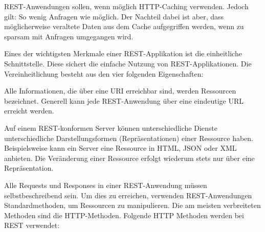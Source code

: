 
REST-Anwendungen sollen, wenn möglich HTTP-Caching verwenden. Jedoch gilt: So wenig Anfragen wie möglich. Der Nachteil dabei ist aber, dass möglicherweise veraltete Daten aus dem Cache aufgegriffen werden, wenn zu sparsam mit Anfragen umgegangen wird. \cite{WikiREST}


Eines der wichtigsten Merkmale einer REST-Applikation ist die einheitliche Schnittstelle. Diese sichert die einfache Nutzung von REST-Applikationen. Die Vereinheitlichung besteht aus den vier folgenden Eigenschaften:

\pagebreak


Alle Informationen, die über eine URI erreichbar sind, werden Ressourcen bezeichnet. Generell kann jede REST-Anwendung über eine eindeutige URL erreicht werden. \cite{WikiREST}


Auf einem REST-konformen Server können unterschiedliche Dienste unterschiedliche Darstellungsformen (Repräsentationen) einer Ressource haben. Beispielsweise kann ein Server eine Ressource in HTML, JSON oder XML anbieten. Die Veränderung einer Ressource erfolgt wiederum stets nur über eine Repräsentation. \cite{WikiREST}


Alle Requests und Responses in einer REST-Anwendung müssen selbstbeschreibend sein. Um dies zu erreichen, verwenden REST-Anwendungen Standardmethoden, um Ressourcen zu manipulieren. Die am meisten verbreiteten Methoden sind die HTTP-Methoden. Folgende HTTP Methoden werden bei REST verwendet:

